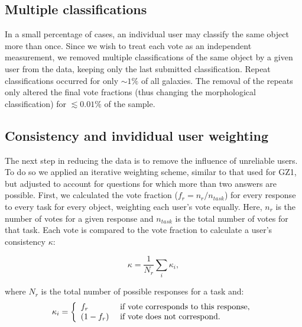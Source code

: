\documentclass[useAMS,usenatbib]{mn2e}
\begin{document}
\subsection{Multiple classifications}
In a small percentage of cases, an individual user may classify the same object more than once. Since we wish to treat each vote as an independent measurement, we removed multiple classifications of the same object by a given user from the data, keeping only the last submitted classification. Repeat classifications occurred for only $\sim1\%$ of all galaxies. The removal of the repeats only altered the final vote fractions (thus changing the morphological classification) for $\lesssim0.01\%$ of the sample.  

\subsection{Consistency and invididual user weighting}\label{ssec-consistency}

The next step in reducing the data is to remove the influence of unreliable users. To do so we applied an iterative weighting scheme, similar to that used for GZ1, but adjusted to account for questions for which more than two answers are possible. First, we calculated the vote fraction ($f_r = n_{r}/n_{task}$) for every response to every task for every object, weighting each user's vote equally. Here, $n_r$ is the number of votes for a given response and $n_{task}$ is the total number of votes for that task. Each vote is compared to the vote fraction to calculate a user's consistency $\kappa$:

\begin{equation}
\kappa = \frac{1}{N_r}\sum_i{\kappa_i},
\label{eqn-consistency}
\end{equation}

where $N_r$ is the total number of possible responses for a task and: 
\begin{equation}
    \kappa_i = \left\{
    \begin{array}{l l}
      f_r       & \text{ if vote corresponds to this response,} \\
      (1 - f_r) & \text{ if vote does not correspond.}\\
    \end{array} \right.
    \label{eqn-consistency2}
 \end{equation}
\end{document}

